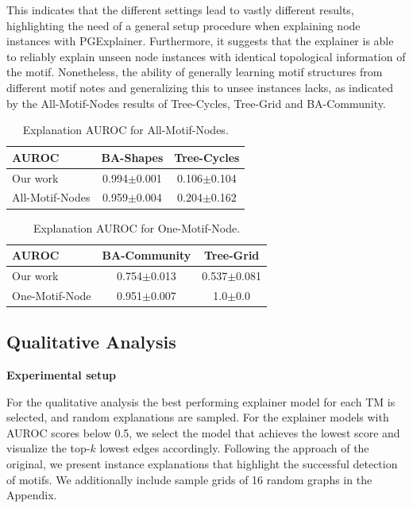 This indicates that the different settings lead to vastly different results, highlighting the need of a general setup procedure when explaining node instances with PGExplainer. Furthermore, it suggests that the explainer is able to reliably explain unseen node instances with identical topological information of the motif. Nonetheless, the ability of generally learning motif structures from different motif notes and generalizing this to unsee instances lacks, as indicated by the All-Motif-Nodes results of Tree-Cycles, Tree-Grid and BA-Community.

\begin{table}[h]
    \centering
    \small
    \begin{tabular}{l|cc}
    \textbf{AUROC} & BA-Shapes & Tree-Cycles \\
    \hline
    Our work & 0.994$\pm$0.001 & 0.106$\pm$0.104 \\
    All-Motif-Nodes & 0.959$\pm$0.004 & 0.204$\pm$0.162 \\
    \end{tabular}
    \caption[Inductive performance using all motif nodes for training]{Explanation AUROC for All-Motif-Nodes.}
    \label{tab:allmotifnodes_selected}
\end{table}

\begin{table}[h]
    \centering
    \small
    \begin{tabular}{l|cc}
    \textbf{AUROC} & BA-Community & Tree-Grid \\
    \hline
    Our work & 0.754$\pm$0.013 & 0.537$\pm$0.081 \\
    One-Motif-Node & 0.951$\pm$0.007 & 1.0$\pm$0.0 \\
    \end{tabular}
    \caption[Inductive performance using one motif node for training]{Explanation AUROC for One-Motif-Node.}
    \label{tab:onemotifnode_selected}
\end{table}

\subsection{Qualitative Analysis}
\label{sec:qual_exp}

\textbf{Experimental setup}\par
For the qualitative analysis the best performing explainer model for each \ac{TM} is selected, and random explanations are sampled. For the explainer models with AUROC scores below 0.5, we select the model that achieves the lowest score and visualize the top-$k$ lowest edges accordingly. Following the approach of the original, we present instance explanations that highlight the successful detection of motifs. We additionally include sample grids of 16 random graphs in the Appendix.

